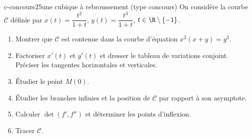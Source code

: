 \begin{exo}{c-concours2}{5}{une cubique à rebroussement (type concours)}
On considère la courbe $\mathcal C$ définie par $x(t)=\dfrac{t^2}{1+t}$, $y(t)=\dfrac{t^3}{1+t}$, $t\in\R\setminus\{-1\}$.
\begin{enumerate}
\item Montrer que $\mathcal C$ est contenue dans la courbe d'équation $x^2(x+y)=y^2$.
\item Factoriser $x'(t)$ et $y'(t)$ et dresser le tableau de variations conjoint. Préciser les tangentes horizontales et verticales.
\item Étudier le point $M(0)$.
\item Étudier les branches infinies et la position de $\mathcal C$ par rapport à son asymptote.
\item Calculer $\det(f',f'')$ et déterminer les points d'inflexion.
\item Tracer $\mathcal C$.
\end{enumerate}
\end{exo}

